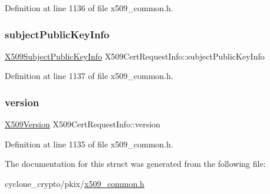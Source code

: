 Definition at line 1136 of file x509\+\_\+common.\+h.

\mbox{\label{structX509CertRequestInfo_ab1c561b08bbbb942b684423343363e22}} 
\subsubsection{\texorpdfstring{subject\+Public\+Key\+Info}{subjectPublicKeyInfo}}
{\footnotesize\ttfamily \hyperlink{structX509SubjectPublicKeyInfo}{X509\+Subject\+Public\+Key\+Info} X509\+Cert\+Request\+Info\+::subject\+Public\+Key\+Info}



Definition at line 1137 of file x509\+\_\+common.\+h.

\mbox{\label{structX509CertRequestInfo_a6888747b5ea57fb90fdf9ae77a30c96d}} 
\subsubsection{\texorpdfstring{version}{version}}
{\footnotesize\ttfamily \hyperlink{certificate_2x509__common_8h_a42c631650a1a4fbe9d70d54d99dcac26}{X509\+Version} X509\+Cert\+Request\+Info\+::version}



Definition at line 1135 of file x509\+\_\+common.\+h.



The documentation for this struct was generated from the following file\+:\begin{DoxyCompactItemize}
\item 
cyclone\+\_\+crypto/pkix/\hyperlink{pkix_2x509__common_8h}{x509\+\_\+common.\+h}\end{DoxyCompactItemize}
